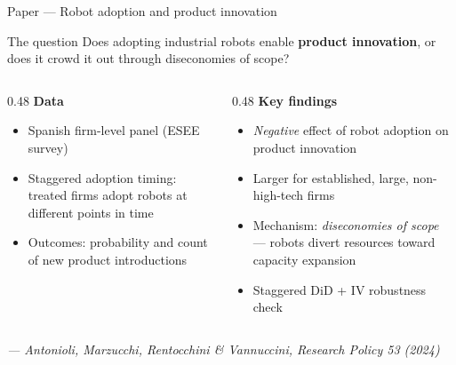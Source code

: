 \documentclass[aspectratio=169, 10pt]{beamer}
\begin{document}

\begin{frame}{Paper — Robot adoption and product innovation}

  \begin{block}{The question}
    Does adopting industrial robots enable \textbf{product innovation},
    or does it crowd it out through diseconomies of scope?
  \end{block}

  \medskip
  \begin{columns}[T]
    \begin{column}{0.48\textwidth}
      \textbf{Data}
      \begin{itemize}
        \item Spanish firm-level panel (ESEE survey)
        \item Staggered adoption timing: treated firms adopt robots at
              different points in time
        \item Outcomes: probability and count of new product introductions
      \end{itemize}
    \end{column}
    \begin{column}{0.48\textwidth}
      \textbf{Key findings}
      \begin{itemize}
        \item \emph{Negative} effect of robot adoption on product innovation
        \item Larger for established, large, non-high-tech firms
        \item Mechanism: \emph{diseconomies of scope} ---
              robots divert resources toward capacity expansion
        \item Staggered DiD + IV robustness check
      \end{itemize}
    \end{column}
  \end{columns}

  \medskip
  \small\textit{\citet{antonioli2024robot} --- Antonioli, Marzucchi,
    Rentocchini \& Vannuccini, \textit{Research Policy} 53 (2024)}

\end{frame}
\end{document}

